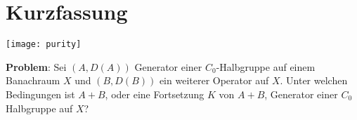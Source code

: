 \chapter{Kurzfassung}

\par
\texttt{[image: purity]}

\par
\textbf{Problem}: Sei $(A, D(A))$ Generator einer $C_0$-Halbgruppe auf einem Banachraum $X$ und $(B, D(B))$ ein weiterer Operator auf $X$. Unter welchen Bedingungen ist $A+B$, oder eine Fortsetzung $K$ von $A+B$, Generator einer $C_0$ Halbgruppe auf $X$?

\par





